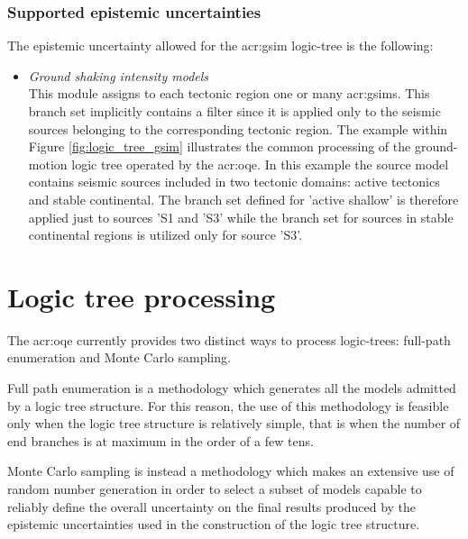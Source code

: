 \subsubsection{Supported epistemic uncertainties}
The epistemic uncertainty allowed for the \gls{acr:gsim} 
logic-tree is the following:
\begin{itemize}
    \item \emph{Ground shaking intensity models} \hfill \\
        This module assigns to each tectonic region one or many 
        \glspl{acr:gsim}. This branch set implicitly contains a 
        filter since it is applied only to the seismic sources 
        belonging to the corresponding tectonic region. The  
        example within Figure \ref{fig:logic_tree_gsim} illustrates
        the common processing of the ground-motion logic tree operated
        by the \gls{acr:oqe}. In this example the source model 
        contains seismic sources included in two tectonic domains:
        active tectonics and stable continental. The branch set defined 
        for 'active shallow' is therefore applied just to sources 'S1 and 'S3' 
        while the branch set for sources in stable continental regions
        is utilized only for source 'S3'.
\end{itemize}
\section{Logic tree processing}
The \gls{acr:oqe} currently provides two distinct ways to process 
logic-trees: full-path enumeration and Monte Carlo sampling. 

Full path enumeration is a methodology which generates all the 
models admitted by a logic tree structure. 
%
For this reason, the use of this methodology is feasible only when 
the logic tree structure is relatively simple, that is when the number 
of end branches is at maximum in the order of a few tens.

Monte Carlo sampling is instead a methodology which makes an extensive 
use of random number generation in order to select a subset of models 
capable to reliably define the overall uncertainty on the final results 
produced by the epistemic uncertainties used in the construction of the 
logic tree structure. 

